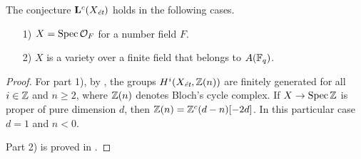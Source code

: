 \documentclass{article}
\numberwithin{equation}{section}
\begin{document}
\begin{lemma}
  \label{lemma:Lc(Xet)-holds-for-OF-and-A(Fq)}
  The conjecture $\mathbf{L}^c (X_\et)$ holds in the following cases.

  \begin{enumerate}
  \item[1)] $X = \Spec \mathcal{O}_F$ for a number field $F$.

  \item[2)] $X$ is a variety over a finite field that belongs to $A (\FF_q)$.
  \end{enumerate}

  \begin{proof}
    For part 1), by \cite[Theorem~5.1~(b)]{Morin-2014}, the groups
    $H^i (X_\et, \ZZ(n))$ are finitely generated for all $i \in \ZZ$ and
    $n \ge 2$, where $\ZZ (n)$ denotes Bloch's cycle complex. If
    $X \to \Spec \ZZ$ is proper of pure dimension $d$, then
    $\ZZ (n) = \ZZ^c (d-n) [-2d]$. In this particular case $d = 1$ and $n < 0$.

    Part 2) is proved in \cite[Proposition~5.7]{Morin-2014}.
  \end{proof}
\end{lemma}
\end{document}
